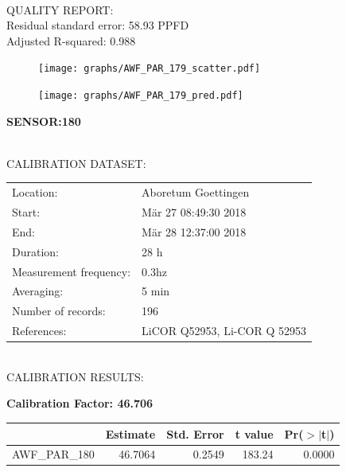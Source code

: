 \documentclass[oneside]{report}
\begin{document}
\hrulefill\\
QUALITY REPORT:\\
Residual standard error: 58.93 PPFD\\
Adjusted R-squared: 0.988



\begin{figure}[H]
  \centering
  \texttt{[image: graphs/AWF\_PAR\_179\_scatter.pdf]}
\end{figure}




\begin{figure}[H]
  \centering
  \texttt{[image: graphs/AWF\_PAR\_179\_pred.pdf]}
\end{figure}

\pagebreak


\begin{center}
\large{\textbf{SENSOR:180}}\\
\end{center}

\hrulefill\\
CALIBRATION DATASET:\\
\begin{table}[h!]
  \centering
  \label{tab:table1}
  \begin{tabular}{ll}
    Location: & Aboretum Goettingen\\ 
    
    
    Start:  & Mär 27 08:49:30 2018 \\
    End:   & Mär 28 12:37:00 2018\\ 
    Duration: & 28 h\\
    Measurement frequency: & 0.3hz\\
    Averaging:  &5 min\\
    Number of records: & 196 \\
    References: & LiCOR Q52953, Li-COR Q 52953 \\
  \end{tabular}
\end{table}

\hrulefill\\
CALIBRATION RESULTS:\\


\begin{center}
\textbf{\large{Calibration Factor: 46.706}}\\
\end{center}
\begin{table}[ht]
\centering
\begin{tabular}{rrrrr}
  \hline
 & Estimate & Std. Error & t value & Pr($>$$|$t$|$) \\ 
  \hline
AWF\_PAR\_180 & 46.7064 & 0.2549 & 183.24 & 0.0000 \\ 
   \hline
\end{tabular}
\end{table}
\end{document}
